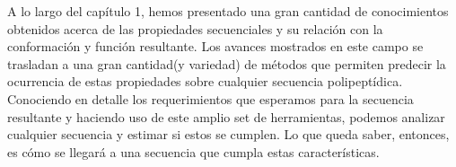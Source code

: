 A lo largo del capítulo 1, hemos presentado una gran cantidad de conocimientos obtenidos acerca de las propiedades secuenciales y su relación con la conformación y función resultante.
Los avances mostrados en este campo se trasladan a una gran cantidad(y variedad) de métodos que permiten predecir la ocurrencia de estas propiedades sobre cualquier secuencia polipeptídica.
% 
Conociendo en detalle los requerimientos que esperamos para la secuencia resultante
y haciendo uso de este amplio set de herramientas, podemos analizar cualquier secuencia y estimar si estos se cumplen.
Lo que queda saber, entonces, es cómo se llegará a una secuencia que cumpla estas características.












